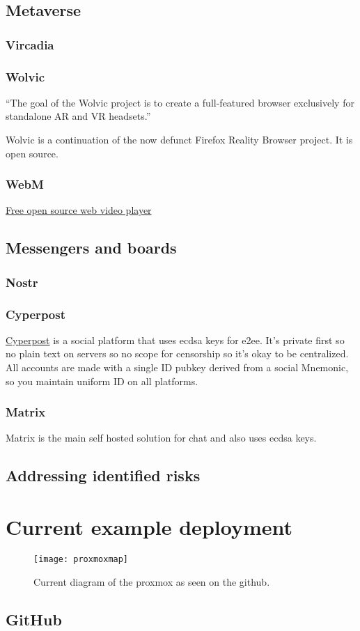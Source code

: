 \section{Metaverse}
\subsection{Vircadia}
\subsection{Wolvic}
``The goal of the Wolvic project is to create a full-featured browser exclusively for standalone AR and VR headsets.''\par
Wolvic is a continuation of the now defunct Firefox Reality Browser project. It is open source.
\subsection{WebM}
\href{https://www.webmproject.org/about/}{Free open source web video player}	
\section{Messengers and boards}
\subsection{Nostr}
\subsection{Cyperpost}
\href{https://github.com/i5hi/cypherpost/}{Cyperpost} is a social platform that uses ecdsa keys for e2ee. It's private first so no plain text on servers so no scope for censorship so it's okay to be centralized. All accounts are made with a single ID pubkey derived from a social Mnemonic, so you maintain uniform ID on all platforms.
\subsection{Matrix}
Matrix is the main self hosted solution for chat and also uses ecdsa keys.
\section{Addressing identified risks}
\chapter{Current example deployment }
\begin{figure*}[ht]\centering %
	\texttt{[image: proxmoxmap]}
	\caption{Current diagram of the proxmox as seen on the github.}
	\label{fig:proxmoxmap}
\end{figure*}
\section{GitHub }
